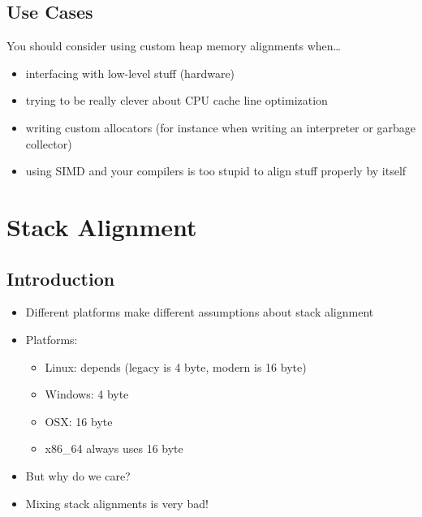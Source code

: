 \documentclass{beamer}
\begin{document}
\subsection{Use Cases}
\begin{frame}{\insertsection}{\insertsubsection}
    You should consider using custom heap memory alignments when\ldots\pause
    \begin{itemize}
        \item interfacing with low-level stuff (hardware)\pause
        \item trying to be really clever about CPU cache line optimization\pause
        \item writing custom allocators (for instance when writing an interpreter or garbage
            collector)\pause
        \item using SIMD and your compilers is too stupid to align stuff properly by itself
    \end{itemize}
\end{frame}

\section{Stack Alignment}
\subsection{Introduction}
\begin{frame}{\insertsection}{\insertsubsection}
    \pause
    \begin{itemize}
        \item Different platforms make different assumptions about stack alignment
        \item Platforms:
            \begin{itemize}
                \item Linux: depends (legacy is 4 byte, modern is 16 byte)
                \item Windows: 4 byte
                \item OSX: 16 byte
                \item x86\_64 always uses 16 byte
            \end{itemize}
            \pause
        \item But why do we care? \pause
        \item Mixing stack alignments is very bad!
    \end{itemize}
\end{frame}
\end{document}
